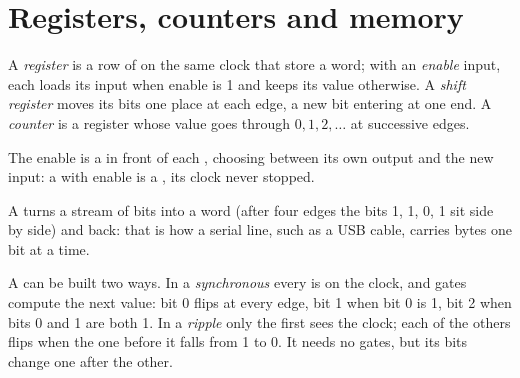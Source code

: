 \section{Registers, counters and memory}\label{sec:b1:sequential-circuits:registers}

\begin{definition}\label{def:b1:sequential-circuits:register}
A \emph{register} is a row of  on the same clock that store a word; with an
\emph{enable} input, each loads its input when enable is 1 and keeps its value otherwise. A \emph{shift
register} moves its bits one place at each edge, a new bit entering at one end. A
\emph{counter} is a register whose value goes through $0, 1, 2, \dots$ at successive edges.
\end{definition}

The enable is a  in front of each , choosing between its own output and the new input: a 
with enable is a , its clock never stopped.

\label{lst:b1:sequential-circuits:shift}

\label{out:b1:sequential-circuits:shift}

A  turns a stream of bits into a word (after four edges the bits 1, 1, 0, 1 sit side by side) and back:
that is how a serial line, such as a USB cable, carries bytes one bit at a time.

A  can be built two ways. In a \emph{synchronous } every  is on the clock, and gates compute the
next value: bit 0 flips at every edge, bit 1 when bit 0 is 1, bit 2 when bits 0 and 1 are both 1. In a \emph{ripple
} only the first  sees the clock; each of the others flips when the one before it falls from 1 to 0. It
needs no gates, but its bits change one after the other.

